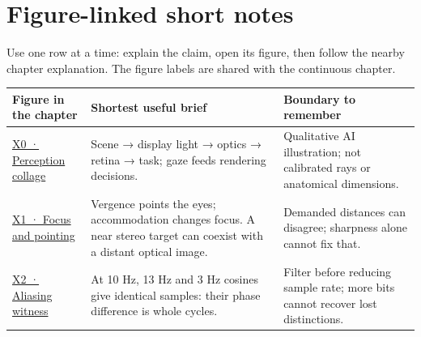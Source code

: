 \section{Figure-linked short notes}\label{appendix-73c6b8ed5a87-figure-linked-short-notes}

Use one row at a time: explain the claim, open its figure, then follow the nearby chapter explanation. The figure labels are shared with the continuous chapter.

{\def\LTcaptype{none} %
\begin{longtable}[]{@{}
  >{\raggedright\arraybackslash}p{}
  >{\raggedright\arraybackslash}p{}
  >{\raggedright\arraybackslash}p{}@{}}
\toprule\noalign{}
\begin{minipage}[b]{\linewidth}\raggedright
Figure in the chapter
\end{minipage} & \begin{minipage}[b]{\linewidth}\raggedright
Shortest useful brief
\end{minipage} & \begin{minipage}[b]{\linewidth}\raggedright
Boundary to remember
\end{minipage} \\
\midrule\noalign{}
\endhead
\bottomrule\noalign{}
\endlastfoot
\href{Continuous\%20Notes/University\%20-\%20Worlds,\%20Images\%20and\%20Inference\%20-\%20Graphics,\%20Vision\%20and\%20Photography\#Figure\%20X0\%20—\%20A\%20qualitative\%20picture\%20of\%20the\%20XR\%20loop/}{X0 · Perception collage} & Scene → display light → optics → retina → task; gaze feeds rendering decisions. & Qualitative AI illustration; not calibrated rays or anatomical dimensions. \\
\href{Continuous\%20Notes/University\%20-\%20Worlds,\%20Images\%20and\%20Inference\%20-\%20Graphics,\%20Vision\%20and\%20Photography\#Figure\%20X1\%20—\%20Two\%20simultaneous\%20depth\%20demands/}{X1 · Focus and pointing} & Vergence points the eyes; accommodation changes focus. A near stereo target can coexist with a distant optical image. & Demanded distances can disagree; sharpness alone cannot fix that. \\
\href{Continuous\%20Notes/University\%20-\%20Worlds,\%20Images\%20and\%20Inference\%20-\%20Graphics,\%20Vision\%20and\%20Photography\#Figure\%20X2\%20—\%20The\%20samples\%20cannot\%20name\%20their\%20original/}{X2 · Aliasing witness} & At 10 Hz, 13 Hz and 3 Hz cosines give identical samples: their phase difference is whole cycles. & Filter before reducing sample rate; more bits cannot recover lost distinctions. \\

\end{longtable}}
